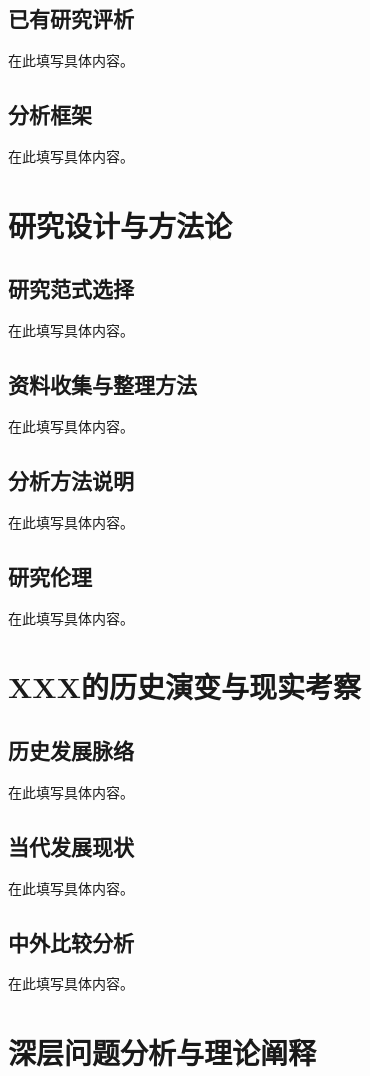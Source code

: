 \documentclass[a4paper,12pt,openright]{ctexrep}
\begin{document}
\section{已有研究评析}
在此填写具体内容。

\section{分析框架}
在此填写具体内容。


\chapter{研究设计与方法论}
\section{研究范式选择}
在此填写具体内容。

\section{资料收集与整理方法}
在此填写具体内容。

\section{分析方法说明}
在此填写具体内容。

\section{研究伦理}
在此填写具体内容。


\chapter{XXX的历史演变与现实考察}
\section{历史发展脉络}
在此填写具体内容。

\section{当代发展现状}
在此填写具体内容。

\section{中外比较分析}
在此填写具体内容。


\chapter{深层问题分析与理论阐释}
\end{document}
